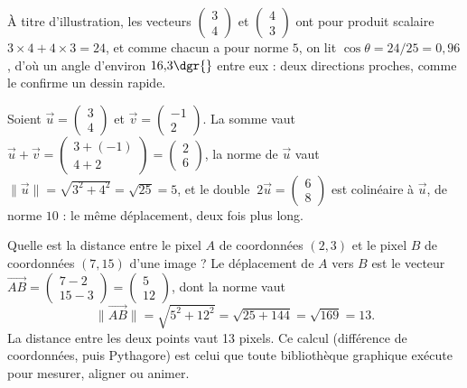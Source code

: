À titre d'illustration, les vecteurs $\begin{pmatrix} 3 \\ 4 \end{pmatrix}$ et $\begin{pmatrix} 4 \\ 3 \end{pmatrix}$ ont pour produit scalaire $3 \times 4 + 4 \times 3 = 24$, et comme chacun a pour norme $5$, on lit $\cos \theta = 24/25 = 0{,}96$, d'où un angle d'environ $16{,}3\dgr{}$ entre eux : deux directions proches, comme le confirme un dessin rapide.

\begin{exemple}
Soient $\vec{u} = \begin{pmatrix} 3 \\ 4 \end{pmatrix}$ et $\vec{v} = \begin{pmatrix} -1 \\ 2 \end{pmatrix}$. La somme vaut $\vec{u} + \vec{v} = \begin{pmatrix} 3 + (-1) \\ 4 + 2 \end{pmatrix} = \begin{pmatrix} 2 \\ 6 \end{pmatrix}$, la norme de $\vec{u}$ vaut $\|\vec{u}\| = \sqrt{3^{2} + 4^{2}} = \sqrt{25} = 5$, et le double $\ 2\vec{u} = \begin{pmatrix} 6 \\ 8 \end{pmatrix}$ est colinéaire à $\vec{u}$, de norme $10$ : le même déplacement, deux fois plus long.
\end{exemple}

\begin{exemple}
Quelle est la distance entre le pixel $A$ de coordonnées $(2, 3)$ et le pixel $B$ de coordonnées $(7, 15)$ d'une image ? Le déplacement de $A$ vers $B$ est le vecteur $\overrightarrow{AB} = \begin{pmatrix} 7 - 2 \\ 15 - 3 \end{pmatrix} = \begin{pmatrix} 5 \\ 12 \end{pmatrix}$, dont la norme vaut
\[
\|\overrightarrow{AB}\| = \sqrt{5^{2} + 12^{2}} = \sqrt{25 + 144} = \sqrt{169} = 13 .
\]
La distance entre les deux points vaut 13 pixels. Ce calcul (différence de coordonnées, puis Pythagore) est celui que toute bibliothèque graphique exécute pour mesurer, aligner ou animer.
\end{exemple}

